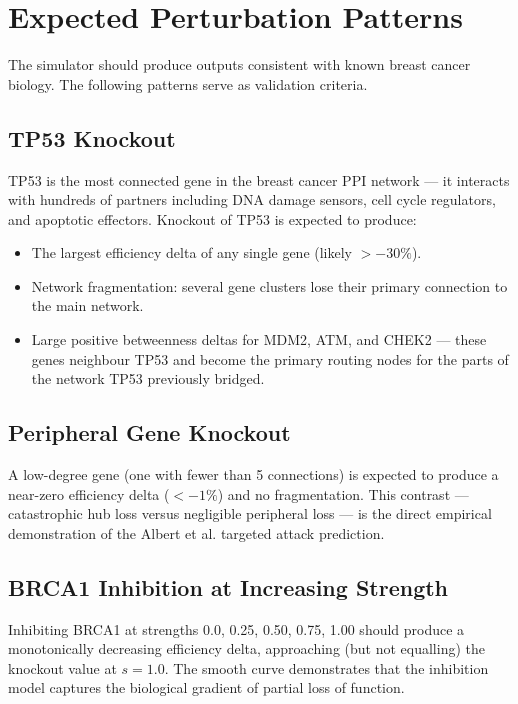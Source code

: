 \documentclass[12pt,a4paper]{report}
\begin{document}
\section{Expected Perturbation Patterns}

The simulator should produce outputs consistent with known breast cancer biology. The following patterns serve as validation criteria.

\subsection{TP53 Knockout}

TP53 is the most connected gene in the breast cancer PPI network — it interacts with hundreds of partners including DNA damage sensors, cell cycle regulators, and apoptotic effectors. Knockout of TP53 is expected to produce:
\begin{itemize}
  \item The largest efficiency delta of any single gene (likely $> -30\%$).
  \item Network fragmentation: several gene clusters lose their primary connection to the main network.
  \item Large positive betweenness deltas for MDM2, ATM, and CHEK2 — these genes neighbour TP53 and become the primary routing nodes for the parts of the network TP53 previously bridged.
\end{itemize}

\subsection{Peripheral Gene Knockout}

A low-degree gene (one with fewer than 5 connections) is expected to produce a near-zero efficiency delta ($< -1\%$) and no fragmentation. This contrast — catastrophic hub loss versus negligible peripheral loss — is the direct empirical demonstration of the Albert et al. targeted attack prediction.

\subsection{BRCA1 Inhibition at Increasing Strength}

Inhibiting BRCA1 at strengths 0.0, 0.25, 0.50, 0.75, 1.00 should produce a monotonically decreasing efficiency delta, approaching (but not equalling) the knockout value at $s = 1.0$. The smooth curve demonstrates that the inhibition model captures the biological gradient of partial loss of function.
\end{document}
